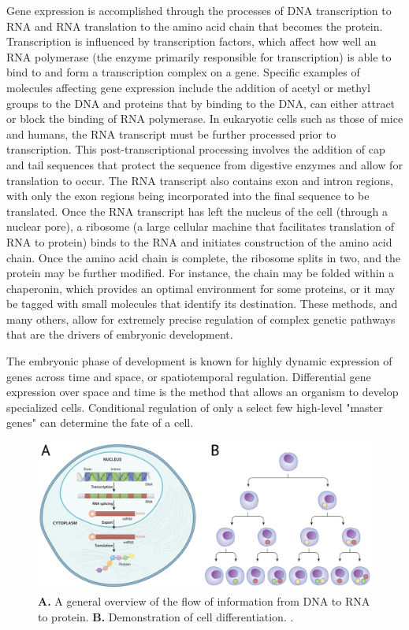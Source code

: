 \documentclass[12pt,oneside,onecolumn,a4paper]{article}
\begin{document}
Gene expression is accomplished through the processes of DNA transcription to RNA and RNA translation to the amino acid chain that becomes the protein. Transcription is influenced by transcription factors, which affect how well an RNA polymerase (the enzyme primarily responsible for transcription) is able to bind to and form a transcription complex on a gene. Specific examples of molecules affecting gene expression include the addition of acetyl or methyl groups to the DNA and proteins that by binding to the DNA, can either attract or block the binding of RNA polymerase. In eukaryotic cells such as those of mice and humans, the RNA transcript must be further processed prior to transcription. This post-transcriptional processing involves the addition of cap and tail sequences that protect the sequence from digestive enzymes and allow for translation to occur. The RNA transcript also contains exon and intron regions, with only the exon regions being incorporated into the final sequence to be translated. Once the RNA transcript has left the nucleus of the cell (through a nuclear pore), a ribosome (a large cellular machine that facilitates translation of RNA to protein) binds to the RNA and initiates construction of the amino acid chain. Once the amino acid chain is complete, the ribosome splits in two, and the protein may be further modified. For instance, the chain may be folded within a chaperonin, which provides an optimal environment for some proteins, or it may be tagged with small molecules that identify its destination. These methods, and many others, allow for extremely precise regulation of complex genetic pathways that are the drivers of embryonic development.

The embryonic phase of development is known for highly dynamic expression of genes across time and space, or spatiotemporal regulation. Differential gene expression over space and time is the method that allows an organism to develop specialized cells. Conditional regulation of only a  select few high-level "master genes" can determine the fate of a cell. 
\citep{bisceglia_2010}

\begin{figure}[h!]
\begin{center}
\includegraphics[width=0.7\columnwidth]{figures/Untitled/Untitled}
\caption{\textbf{A.} A general overview of the flow of information from DNA to RNA to protein. \textbf{B.} Demonstration of cell differentiation. \citep{bisceglia_2010}.%
}
\end{center}
\end{figure}
\end{document}
